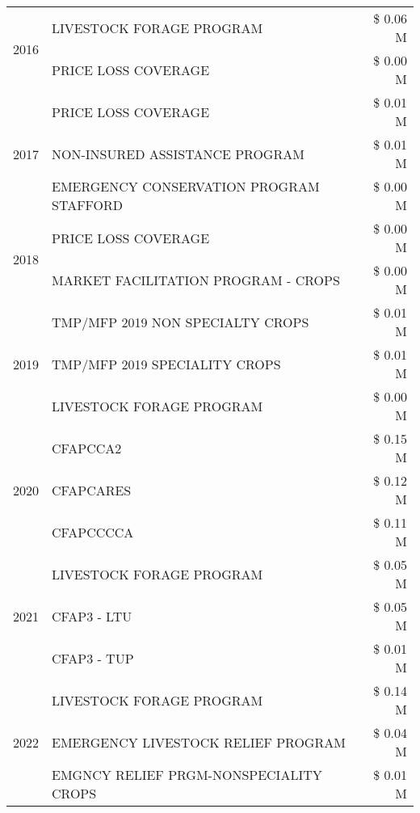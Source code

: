 \begin{tabular}{llr}
\cline{1-3}
\multirow[t]{2}{*}{2016} & LIVESTOCK FORAGE PROGRAM & \$ 0.06 M \\
 & PRICE LOSS COVERAGE & \$ 0.00 M \\
\cline{1-3}
\multirow[t]{3}{*}{2017} & PRICE LOSS COVERAGE & \$ 0.01 M \\
 & NON-INSURED ASSISTANCE PROGRAM & \$ 0.01 M \\
 & EMERGENCY CONSERVATION PROGRAM STAFFORD & \$ 0.00 M \\
\cline{1-3}
\multirow[t]{2}{*}{2018} & PRICE LOSS COVERAGE & \$ 0.00 M \\
 & MARKET FACILITATION PROGRAM - CROPS & \$ 0.00 M \\
\cline{1-3}
\multirow[t]{3}{*}{2019} & TMP/MFP 2019 NON SPECIALTY CROPS & \$ 0.01 M \\
 & TMP/MFP 2019 SPECIALITY CROPS & \$ 0.01 M \\
 & LIVESTOCK FORAGE PROGRAM & \$ 0.00 M \\
\cline{1-3}
\multirow[t]{3}{*}{2020} & CFAPCCA2 & \$ 0.15 M \\
 & CFAPCARES & \$ 0.12 M \\
 & CFAPCCCCA & \$ 0.11 M \\
\cline{1-3}
\multirow[t]{3}{*}{2021} & LIVESTOCK FORAGE PROGRAM & \$ 0.05 M \\
 & CFAP3 - LTU & \$ 0.05 M \\
 & CFAP3 - TUP & \$ 0.01 M \\
\cline{1-3}
\multirow[t]{3}{*}{2022} & LIVESTOCK FORAGE PROGRAM & \$ 0.14 M \\
 & EMERGENCY LIVESTOCK RELIEF PROGRAM & \$ 0.04 M \\
 & EMGNCY RELIEF PRGM-NONSPECIALITY CROPS & \$ 0.01 M \\
\cline{1-3}
\bottomrule
\end{tabular}
